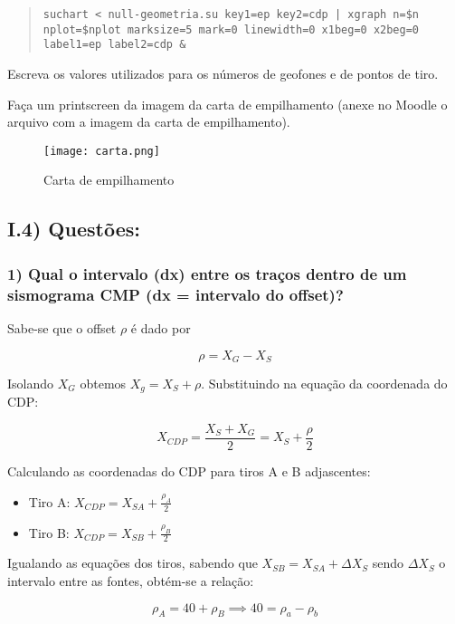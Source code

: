 \documentclass[12pt,a4paper]{article}
\begin{document}
\begin{quote}
\texttt{suchart < null-geometria.su key1=ep key2=cdp | xgraph n=\$n nplot=\$nplot marksize=5 mark=0 linewidth=0 x1beg=0 x2beg=0 label1=ep label2=cdp \&}
\end{quote}

Escreva os valores utilizados para os números de geofones e de pontos de tiro.

Faça um printscreen da imagem da carta de empilhamento (anexe no Moodle o arquivo com a imagem da carta de empilhamento).


\begin{figure}[h]
    \centering
    \texttt{[image: carta.png]}
    \caption{Carta de empilhamento}
    \label{fig:placeholder}
\end{figure}



\subsection{I.4) Questões:}

\subsubsection{1) Qual o intervalo (dx) entre os traços dentro de um sismograma CMP (dx = intervalo do offset)?}


Sabe-se que o offset $\rho$ é dado por 

\begin{equation}
    \rho = X_G - X_S
\end{equation}

Isolando $X_G$ obtemos $X_g = X_S + \rho$. Substituindo na equação da coordenada do CDP:

$$ X_{CDP} = \frac{X_S + X_G}{2} = X_S + \frac{\rho}{2}$$

Calculando as coordenadas do CDP para tiros A e B adjascentes:

\begin{itemize}
    \item Tiro A: $X_{CDP}  = X_{SA} + \frac{\rho_A}{2}$
    \item Tiro B: $X_{CDP}  = X_{SB} + \frac{\rho_B}{2}$
\end{itemize}


Igualando as equações dos tiros, sabendo que $X_{SB} = X_{SA} + \Delta X_S$ sendo $\Delta X_S$ o intervalo entre as fontes, obtém-se a relação:

$$ \rho_A = 40 + \rho_B \implies 40 = \rho_a - \rho_b$$
\end{document}
